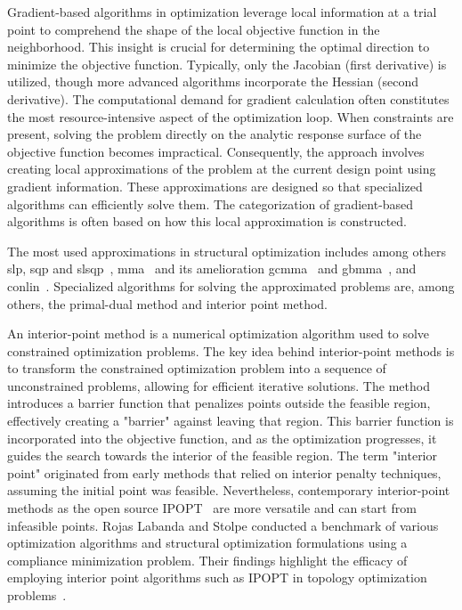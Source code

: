 Gradient-based algorithms in optimization leverage local information at a trial point to comprehend the shape of the local objective function in the neighborhood. This insight is crucial for determining the optimal direction to minimize the objective function. Typically, only the Jacobian (first derivative) is utilized, though more advanced algorithms incorporate the Hessian (second derivative). The computational demand for gradient calculation often constitutes the most resource-intensive aspect of the optimization loop. When constraints are present, solving the problem directly on the analytic response surface of the objective function becomes impractical. Consequently, the approach involves creating local approximations of the problem at the current design point using gradient information. These approximations are designed so that specialized algorithms can efficiently solve them. The categorization of gradient-based algorithms is often based on how this local approximation is constructed.

The most used approximations in structural optimization includes among others \gls{slp}, \gls{sqp} and \gls{slsqp}~, \gls{mma}~ and its amelioration \gls{gcmma}~ and \gls{gbmma}~, and \gls{conlin}~. Specialized algorithms for solving the approximated problems are, among others, the primal-dual method and interior point method.

An interior-point method is a numerical optimization algorithm used to solve constrained optimization problems. The key idea behind interior-point methods is to transform the constrained optimization problem into a sequence of unconstrained problems, allowing for efficient iterative solutions. The method introduces a barrier function that penalizes points outside the feasible region, effectively creating a "barrier" against leaving that region. This barrier function is incorporated into the objective function, and as the optimization progresses, it guides the search towards the interior of the feasible region. The term "interior point" originated from early methods that relied on interior penalty techniques, assuming the initial point was feasible. Nevertheless, contemporary interior-point methods as the open source IPOPT~ are more versatile and can start from infeasible points. Rojas Labanda and Stolpe conducted a benchmark of various optimization algorithms and structural optimization formulations using a compliance minimization problem. Their findings highlight the efficacy of employing interior point algorithms such as IPOPT in topology optimization problems~.

